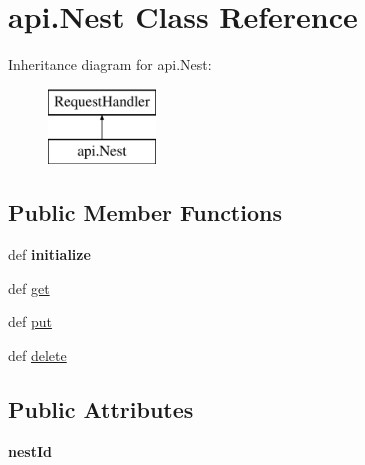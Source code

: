 \hypertarget{classapi_1_1_nest}{\section{api.\-Nest Class Reference}
\label{classapi_1_1_nest}
}
Inheritance diagram for api.\-Nest\-:\begin{figure}[H]
\begin{center}
\leavevmode
\includegraphics[height=2.000000cm]{classapi_1_1_nest}
\end{center}
\end{figure}
\subsection*{Public Member Functions}
\begin{DoxyCompactItemize}
\item 
\hypertarget{classapi_1_1_nest_ac63c05297a0c2a9ef7c4d78649bd6882}{def {\bfseries initialize}}\label{classapi_1_1_nest_ac63c05297a0c2a9ef7c4d78649bd6882}

\item 
def \hyperlink{classapi_1_1_nest_abc52411100635182cbd712b9f3014ea8}{get}
\item 
def \hyperlink{classapi_1_1_nest_a1b722ddb518afce74b5a59be42e7af09}{put}
\item 
def \hyperlink{classapi_1_1_nest_a224057785cc58de52b2fb5ba9edbb044}{delete}
\end{DoxyCompactItemize}
\subsection*{Public Attributes}
\begin{DoxyCompactItemize}
\item 
\hypertarget{classapi_1_1_nest_a4aae8cb29281cfd74c4c975fe309d612}{{\bfseries nest\-Id}}\label{classapi_1_1_nest_a4aae8cb29281cfd74c4c975fe309d612}

\end{DoxyCompactItemize}


